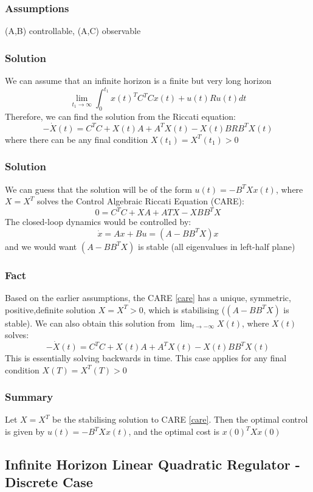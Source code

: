 \documentclass{article}
\begin{document}
\subsubsection*{Assumptions}
(A,B) controllable, (A,C) observable 
\subsubsection*{Solution}
We can assume that an infinite horizon is a finite but very long horizon 
\[
\lim_{t_1 \rightarrow \infty} \int_0^{t_1} x(t)^T C^T C x(t) + u(t) R u(t) dt
\]
Therefore, we can find the solution from the Riccati equation:
\[
-\dot X(t) = C^TC + X(t) A + A^T X(t) - X(t) BRB^T X(t)
\]
where there can be any final condition $X(t_1) = X^T(t_1) > 0$
\subsubsection*{Solution}
We can guess that the solution will be of the form $u(t) = -B^T X x(t)$, where $X = X^T$ solves the Control Algebraic Riccati Equation (CARE):
\begin{equation}\label{care}
0 = C^TC + XA + ATX - XBB^T X 
\end{equation}
The closed-loop dynamics would be controlled by:
\[
\dot x = Ax + Bu = (A-BB^T X)x
\]
and we would want $(A-BB^TX)$ is stable (all eigenvalues in left-half plane)
\subsubsection*{Fact}
Based on the earlier assumptions, the CARE \eqref{care} has a unique, symmetric, positive,definite solution $X = X^T > 0$, which is stabilising ($(A-BB^TX)$ is stable). We can also obtain this solution from $\lim_{t \rightarrow -\infty} X(t)$, where $X(t)$ solves:
\[
-\dot X(t) = C^TC + X(t) A + A^T X(t) - X(t) BB^T X(t)
\]
This is essentially solving backwards in time. This case applies for any final condition $X(T) = X^T(T) > 0$
\subsubsection*{Summary}
Let $X = X^T$ be the stabilising solution to CARE \eqref{care}. Then the optimal control is given by $u(t) = -B^T Xx(t)$, and the optimal cost is $x(0)^T X x(0)$
\subsection{Infinite Horizon Linear Quadratic Regulator - Discrete Case}
\end{document}
